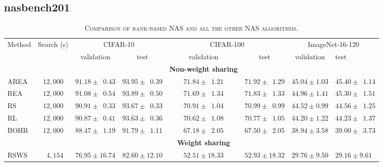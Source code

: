 \documentclass[sigconf]{acmart}
\begin{document}
    \subsection*{nasbench201}
    \begin{table*}[htb]
        \newcommand{\z}{\phantom{0}}
        \caption{\textsc{Comparison of rank-based NAS and all the other NAS algorithms.}}
          \vspace{-\baselineskip}
        \begin{tabular}{@{}lccccccl@{}}\toprule
        Method & Search (s) & \multicolumn{2}{c}{CIFAR-10} & \multicolumn{2}{c}{CIFAR-100} & \multicolumn{2}{c}{ImageNet-16-120} \\ \cmidrule(lr){3-4}\cmidrule(lr){5-6}\cmidrule(lr){7-8}
        & & validation & test & validation & test & validation & test \\ \midrule
        &&&&\textbf{Non-weight sharing}&&&\\
        AREA      & $12,000$ & $91.18 \pm \z{0.43}$                & $93.95 \pm \z{0.39}$               & $71.84 \pm \z{1.21}$                 & $71.92 \pm \z{1.29}$                & $45.04 \pm 1.03$                 & $45.40 \pm \z{1.14}$                \\
        REA       & $12,000$ & $91.08 \pm \z{0.54}$                & $93.89 \pm \z{0.50}$               & $71.69 \pm \z{1.34}$                 & $71.83 \pm \z{1.33}$                & $44.96 \pm 1.41$                 & $45.30 \pm \z{1.51}$                \\
        RS        & $12,000$ & $90.91 \pm \z{0.33}$                & $93.67 \pm \z{0.33}$               & $70.91 \pm \z{1.04}$                 & $70.99 \pm \z{0.99}$                & $44.52 \pm 0.99$                 & $44.56 \pm \z{1.25}$                \\
        RL        & $12,000$ & $90.87 \pm \z{0.41}$                & $93.63 \pm \z{0.36}$               & $70.62 \pm \z{1.08}$                 & $70.77 \pm \z{1.05}$                & $44.20 \pm 1.22$                 & $44.23 \pm \z{1.37}$                \\
        BOHB      & $12,000$ & $88.47 \pm \z{1.19}$                & $91.79 \pm \z{1.11}$               & $67.18 \pm \z{2.05}$                 & $67.50 \pm \z{2.05}$                & $38.94 \pm 3.58$                 & $39.00 \pm \z{3.73}$                \\ \midrule
        &&&&\textbf{Weight sharing}&&&\\
        RSWS      & $\z{4,154}$  & $76.95 \pm 16.74$                & $82.60 \pm 12.10$               & $52.51 \pm 18.33$                & $52.93 \pm 18.32$                   & $29.76 \pm 9.50$                 & $29.16 \pm 9.61$               \\

\end{tabular}
\end{table*}
\end{document}
